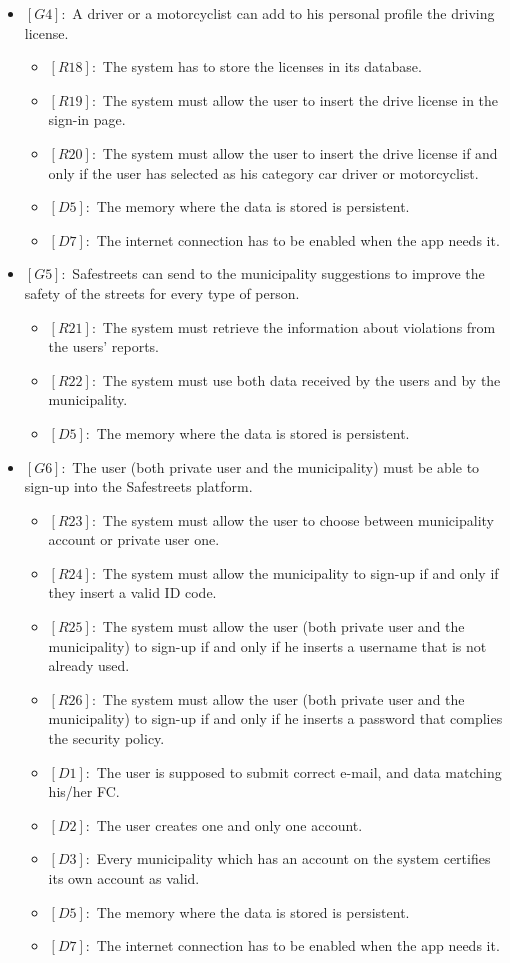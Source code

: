 \documentclass[titlepage]{article}
\begin{document}
\begin{itemize}
 \item $[G4]:$ A driver or a motorcyclist can add to his personal profile the driving license.
 \begin{itemize}
 \item $[R18]:$ The system has to store the licenses in its database.
 \item $[R19]:$ The system must allow the user to insert the drive license in the sign-in page.
 \item $[R20]:$ The system must allow the user to insert the drive license if and only if the user has selected as his category car driver or motorcyclist.
 \item $[D5]:$ The memory where the data is stored is persistent.
 \item $[D7]:$ The internet connection has to be enabled when the app needs it.
 \end{itemize}
 
 
 \item $[G5]:$ Safestreets can send to the municipality suggestions to improve the safety of the streets for every type of person.
 \begin{itemize}
 \item $[R21]:$ The system must retrieve the information about violations from the users' reports.
 \item $[R22]:$ The system must use both data received by the users and by the municipality.
 \item $[D5]:$ The memory where the data is stored is persistent.
 \end{itemize}
 
 
 \item $[G6]:$ The user (both private user and the municipality) must be able to sign-up into the Safestreets platform.
 \begin{itemize}
 \item $[R23]:$ The system must allow the user to choose between municipality account or private user one.
 \item $[R24]:$ The system must allow the municipality to sign-up if and only if they insert a valid ID code.
 \item $[R25]:$ The system must allow the user (both private user and the municipality) to sign-up if and only if he inserts a username that is not already used.
 \item $[R26]:$ The system must allow the user (both private user and the municipality) to sign-up if and only if he inserts a password that complies the security policy.
 \item $[D1]:$ The user is supposed to submit correct e-mail, and data matching his/her FC.
 \item $[D2]:$ The user creates one and only one account.
 \item $[D3]:$ Every municipality which has an account on the system certifies its own account as valid.
 \item $[D5]:$ The memory where the data is stored is persistent.
 \item $[D7]:$ The internet connection has to be enabled when the app needs it.
 \end{itemize}
 

\end{itemize}
\end{document}
